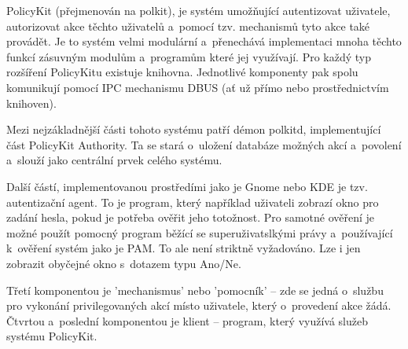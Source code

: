 PolicyKit (přejmenován na polkit), je systém umožňující autentizovat uživatele,
autorizovat akce těchto uživatelů a~pomocí tzv. mechanismů tyto akce také
provádět. Je to systém velmi modulární a~přenechává implementaci mnoha těchto 
funkcí zásuvným modulům a~programům které jej využívají. Pro každý typ rozšíření
PolicyKitu existuje knihovna. Jednotlivé komponenty pak spolu komunikují pomocí
IPC mechanismu DBUS (ať už přímo nebo prostřednictvím knihoven).

Mezi nejzákladnější části tohoto systému patří démon polkitd, implementující
část PolicyKit Authority. Ta se stará o~uložení databáze možných akcí
a~povolení a~slouží jako centrální prvek celého systému.

Další částí, implementovanou prostředími jako je Gnome nebo KDE je tzv.
autentizační agent. To je program, který například uživateli zobrazí okno pro
zadání hesla, pokud je potřeba ověřit jeho totožnost. Pro samotné ověření je
možné použít pomocný program běžící se superuživatslkými právy a~používající
k~ověření systém jako je PAM. To ale není striktně vyžadováno. Lze i jen
zobrazit obyčejné okno s~dotazem typu Ano/Ne.%

Třetí komponentou je 'mechanismus' nebo 'pomocník' -- zde se jedná o~službu pro
vykonání privilegovaných akcí místo uživatele, který o~provedení akce žádá.
Čtvrtou a~poslední komponentou je klient -- program, který využívá služeb
systému PolicyKit.


